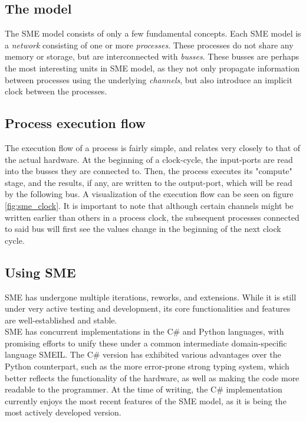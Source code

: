\subsection{The model} The SME model consists of only a few fundamental
concepts. Each SME model is a \textit{network} consisting of one or more
\textit{processes}. These processes do not share any memory or storage,
but are interconnected with \textit{busses}.  These busses are perhaps
the most interesting units in SME model, as they not only propagate
information between processes using the underlying \textit{channels},
but also introduce an implicit clock between the processes.\\

\subsection{Process execution flow} The execution flow of a process is
fairly simple, and relates very closely to that of the actual hardware. At
the beginning of a clock-cycle, the input-ports are read into the busses
they are connected to. Then, the process executes its "compute" stage, and
the results, if any, are written to the output-port, which will be read
by the following bus. A visualization of the execution flow can be seen
on figure \ref{fig:sme_clock}.  
It is important to note that although certain channels might be written earlier
than others in a process clock, the subsequent processes connected to said bus
will first see the values change in the beginning of the next clock cycle.


\subsection{Using SME}
SME has undergone multiple iterations, reworks, and extensions. While
it is still under very active testing and development, its core
functionalities and features
 are well-established and stable\cite{bus_centric_sme}.\\
SME has concurrent implementations in the C\# and Python languages,
with promising efforts to unify these under a common intermediate
domain-specific language SMEIL\cite{smeil}. The C\# version has
exhibited various advantages over the Python counterpart, such as
the more error-prone strong typing system, which better reflects the
functionality of the hardware, as well as making the code more readable to
the programmer. At the time of writing, the C\# implementation currently
enjoys the most recent features of the SME model, as it is being the
most actively developed version.


